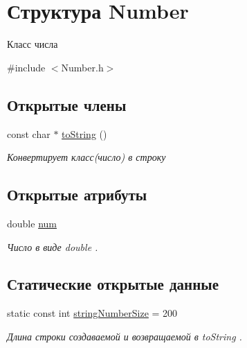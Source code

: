 \hypertarget{struct_number}{
\section{Структура Number}
\label{struct_number}
}


Класс числа  




{\ttfamily \#include $<$Number.h$>$}

\subsection*{Открытые члены}
\begin{DoxyCompactItemize}
\item 
const char $\ast$ \hyperlink{group___solution_system_ga465cef1eb6dbaa3741d987df52e4df1f}{toString} ()
\begin{DoxyCompactList}\small\item\em Конвертирует класс(число) в строку \item\end{DoxyCompactList}\end{DoxyCompactItemize}
\subsection*{Открытые атрибуты}
\begin{DoxyCompactItemize}
\item 
\hypertarget{group___solution_system_ga4935cf931b2603e03a356b6981b223da}{
double \hyperlink{group___solution_system_ga4935cf931b2603e03a356b6981b223da}{num}}
\label{group___solution_system_ga4935cf931b2603e03a356b6981b223da}

\begin{DoxyCompactList}\small\item\em Число в виде double . \item\end{DoxyCompactList}\end{DoxyCompactItemize}
\subsection*{Статические открытые данные}
\begin{DoxyCompactItemize}
\item 
\hypertarget{group___solution_system_ga46afc3dcc87e83f7708a280d2283324e}{
static const int \hyperlink{group___solution_system_ga46afc3dcc87e83f7708a280d2283324e}{stringNumberSize} = 200}
\label{group___solution_system_ga46afc3dcc87e83f7708a280d2283324e}

\begin{DoxyCompactList}\small\item\em Длина строки создаваемой и возвращаемой в toString . \item\end{DoxyCompactList}\end{DoxyCompactItemize}


